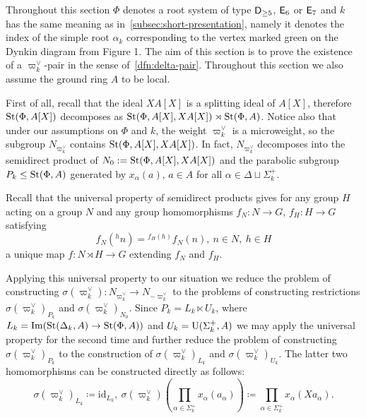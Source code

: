 \usepackage{mathtools}Throughout this section $\Phi$ denotes a root system of type $\mathsf{D}_{\geq 5}$, $\mathsf{E}_6$ or $\mathsf{E}_7$ and
 $k$ has the same meaning as in~\cref{subsec:short-presentation}, namely
 it denotes the index of the simple root $\alpha_k$ corresponding to the vertex marked green on the Dynkin diagram from Figure 1.
The aim of this section is to prove the existence of a $\varpi_k^\vee$-pair in the sense of~\cref{dfn:delta-pair}.
Throughout this section we also assume the ground ring $A$ to be local.

First of all, recall that the ideal $XA[X]$ is a splitting ideal of $A[X]$, therefore
 $\operatorname{St}(\Phi, A[X])$ decomposes as $\operatorname{St}(\Phi, A[X], XA[X]) \rtimes \operatorname{St}(\Phi, A)$.
Notice also that under our assumptions on $\Phi$ and $k$, the weight $\varpi_k^\vee$ is a microweight, so the subgroup $N_{\varpi_k^\vee}$ contains $\operatorname{St}(\Phi, A[X], XA[X])$.
In fact, $N_{\varpi_k^\vee}$ decomposes into the semidirect product of $N_0 := \operatorname{St}(\Phi, A[X], XA[X])$ and the parabolic subgroup $P_k \leq \operatorname{St}(\Phi, A)$
 generated by $x_\alpha(a)$, $a \in A$ for all $\alpha \in \Delta \sqcup \Sigma^+_k$.

Recall that the universal property of semidirect products gives for any group $H$ acting on a group $N$
 and any group homomorphisms $f_N\colon N \to G$, $f_H\colon H \to G$ satisfying
\begin{equation}
    \label{eq:coherence-condition} f_N({}^hn) = {}^{f_H(h)} f_N(n),\ n\in N,\ h\in H
\end{equation}
a unique map $f\colon N \rtimes H \to G$ extending $f_N$ and $f_H$.

Applying this universal property to our situation we reduce the problem of constructing $\sigma(\varpi_k^\vee) \colon N_{\varpi_k^\vee} \to N_{-\varpi_k^\vee}$
 to the problems of constructing restrictions $\sigma(\varpi_k^\vee)_{P_k}$ and $\sigma(\varpi_k^\vee)_{N_0}$.
Since $P_k = L_k \ltimes U_k$, where $L_k = \mathrm{Im}(\operatorname{St}(\Delta_k, A) \to \operatorname{St}(\Phi, A))$
and $U_k = \operatorname{U}(\Sigma_k^+, A)$ we may apply the universal property for the second time and further reduce the problem of constructing $\sigma(\varpi_k^\vee)_{P_k}$
 to the construction of $\sigma(\varpi_k^\vee)_{L_k}$ and $\sigma(\varpi_k^\vee)_{U_k}$.
The latter two homomorphisms can be constructed directly as follows:
\[\sigma(\varpi_k^\vee)_{L_k} \coloneqq \mathrm{id}_{L_k},\ \sigma(\varpi_k^\vee)\left(\prod\limits_{\alpha \in \Sigma_k^+} x_\alpha(a_\alpha)\right) \coloneqq \prod\limits_{\alpha \in \Sigma_k^+} x_\alpha(Xa_\alpha).\]

